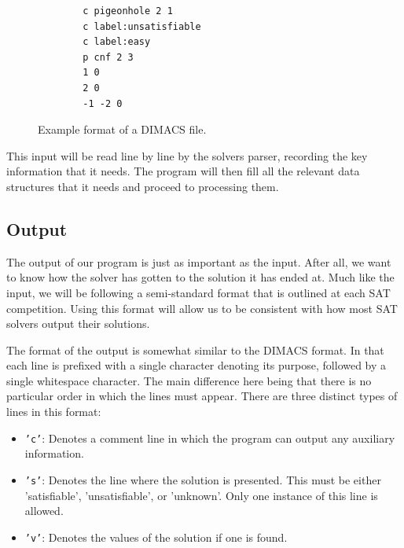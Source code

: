 \documentclass{article}
\begin{document}
\begin{figure}[h]
    \centering
    \begin{lstlisting}
        c pigeonhole 2 1
        c label:unsatisfiable
        c label:easy
        p cnf 2 3
        1 0
        2 0
        -1 -2 0
    \end{lstlisting}
    \caption{Example format of a DIMACS file.}
\end{figure}


This input will be read line by line by the solvers parser, recording the key information that it
needs. The program will then fill all the relevant data structures that it needs and proceed to processing them.

\subsection{Output}

The output of our program is just as important as the input. After all, we want to know how the
solver has gotten to the solution it has ended at. Much like the input, we will be following a
semi-standard format that is outlined at each SAT competition. Using this format will allow us to be
consistent with how most SAT solvers output their solutions.

The format of the output is somewhat similar to the DIMACS format. In that each line is prefixed
with a single character denoting its purpose, followed by a single whitespace character. The main
difference here being that there is no particular order in which the lines must appear. There are
three distinct types of lines in this format:

\begin{itemize}
    \item \texttt{'c'}: Denotes a comment line in which the program can output any auxiliary
          information.
    \item \texttt{'s'}: Denotes the line where the solution is presented. This must be either
          'satisfiable', 'unsatisfiable', or 'unknown'. Only one instance of this line is allowed.
    \item \texttt{'v'}: Denotes the values of the solution if one is found.
\end{itemize}
\end{document}

